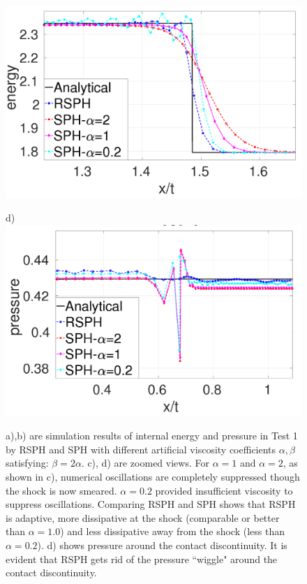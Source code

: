 \documentclass[review]{elsarticle}
\begin{document}
\begin{figure}[H]
\begin{minipage}{.495 \textwidth}
        \includegraphics[width=0.99 \textwidth, height=0.7\textwidth]{./Figures/RCM-Sod-SPH-alf-e-zoom}
    \end{minipage}%
    \begin{minipage}{.495\textwidth}
        \centering d)
        \includegraphics[width=0.99 \textwidth, height=0.7\textwidth]{./Figures/RCM-Sod-SPH-alf-p-zoom}
    \end{minipage}%
    \caption{
    a),b) are simulation results of internal energy and pressure in Test 1 by RSPH and SPH with different artificial viscosity coefficients $\alpha,\beta$ satisfying: $\beta=2\alpha$.  c), d) are zoomed views.  For $\alpha=1$ and $\alpha=2$, as shown in c), numerical oscillations are completely suppressed though the shock is now smeared. $\alpha=0.2$ provided insufficient viscosity to suppress oscillations. Comparing RSPH and SPH shows that RSPH is adaptive, more dissipative at the shock (comparable or better than $\alpha=1.0$) and less dissipative away from the shock (less than $\alpha=0.2$). d) shows pressure around the contact discontinuity. It is evident that RSPH gets rid of the pressure ``wiggle" around the contact discontinuity.}
    \label{fig:RCM-Sod-SPH-alf-zoom}
\end{figure}
\end{document}
